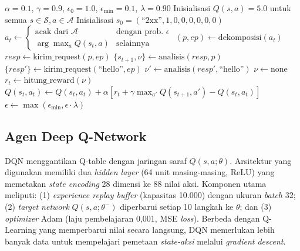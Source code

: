 \documentclass[a4paper,12pt]{article}
\begin{document}
\begin{algorithm}[H]
\caption{\textit{Web Penetration Testing} dengan Q-Learning}
\label{alg:ql}
\small
\begin{algorithmic}[1]
\Require $\alpha = 0.1$, $\gamma = 0.9$, $\epsilon_0 = 1.0$, $\epsilon_{\min} = 0.1$, $\lambda = 0.90$
\State Inisialisasi $Q(s,a) = 5.0$ untuk semua $s \in \mathcal{S}, a \in \mathcal{A}$
\State Inisialisasi $s_0 = (\text{``2xx''}, 1, 0, 0, 0, 0, 0, 0)$
    \State $a_t \gets \begin{cases}
        \text{acak dari } \mathcal{A} & \text{dengan prob. } \epsilon \\
        \arg\max_a Q(s_t, a) & \text{selainnya}
    \end{cases}$
    \State $(p, ep) \gets \text{dekomposisi}(a_t)$
    \State $resp \gets \text{kirim\_request}(p, ep)$
    \State $\{s_{t+1}, \nu\} \gets \text{analisis}(resp, p)$
        \State $\{resp'\} \gets \text{kirim\_request}(\text{``hello''}, ep)$
        \State $\nu' \gets \text{analisis}(resp', \text{``hello''})$
            \State $\nu \gets \text{none}$ 
        \EndIf
    \EndIf
    \State $r_t \gets \text{hitung\_reward}(\nu)$
    \State $Q(s_t,a_t) \gets Q(s_t,a_t) + \alpha[r_t + \gamma\max_{a'} Q(s_{t+1},a') - Q(s_t,a_t)]$
    \State $\epsilon \gets \max(\epsilon_{\min}, \epsilon \cdot \lambda)$
\EndFor
\end{algorithmic}
\end{algorithm}

\subsection{Agen Deep Q-Network}

DQN \cite{mnih2015} menggantikan Q-table dengan jaringan saraf $Q(s,a;\theta)$. Arsitektur yang digunakan memiliki dua \textit{hidden layer} (64 unit masing-masing, ReLU) yang memetakan \textit{state encoding} 28 dimensi ke 88 nilai aksi. Komponen utama meliputi: (1) \textit{experience replay buffer} (kapasitas 10.000) dengan ukuran \textit{batch} 32; (2) \textit{target network} $Q(s,a;\theta^-)$ diperbarui setiap 10 langkah ke $\theta$; dan (3) \textit{optimizer} Adam (laju pembelajaran 0,001, MSE \textit{loss}). Berbeda dengan Q-Learning yang memperbarui nilai secara langsung, DQN memerlukan lebih banyak data untuk mempelajari pemetaan \textit{state-aksi} melalui \textit{gradient descent}.
\end{document}
